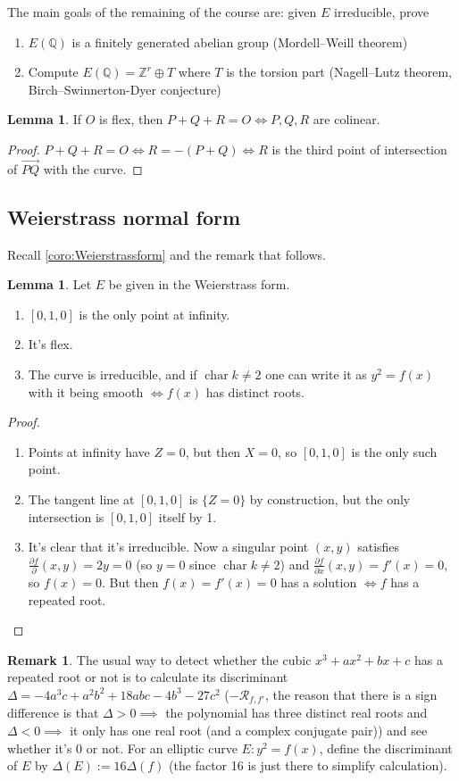 \documentclass{article}
\newcommand{\Z}{\mathbb{Z}}
\newcommand{\Q}{\mathbb{Q}}
\newcommand{\Char}{\operatorname{char}}
\theoremstyle{definition}
\newtheorem{lemma}[defn]{Lemma}
\newtheorem*{remark}{Remark}
\begin{document}
The main goals of the remaining of the course are: given $E$ irreducible, prove
\begin{enumerate}
\item $E(\Q)$ is a finitely generated abelian group (Mordell--Weill theorem)
\item Compute $E(\Q)=\Z^r\oplus T$ where $T$ is the torsion part (Nagell--Lutz theorem, Birch--Swinnerton-Dyer conjecture)
\end{enumerate}

\begin{lemma}
\label{lemma:condPQRcol}
If $O$ is flex, then $P+Q+R=O\iff P,Q,R$ are colinear.
\end{lemma}
\begin{proof}
$P+Q+R=O\iff R=-(P+Q)\iff R$ is the third point of intersection of $\overrightarrow{PQ}$ with the curve.
\end{proof}

\subsection{Weierstrass normal form}
Recall \ref{coro:Weierstrassform} and the remark that follows.
\begin{lemma}
\label{lemma:weierstrass}
Let $E$ be given in the Weierstrass form.
\begin{enumerate}
\item $[0,1,0]$ is the only point at infinity.
\item It's flex.
\item The curve is irreducible, and if $\Char k\neq 2$ one can write it as $y^2=f(x)$ with it being smooth $\iff f(x)$ has distinct roots.
\end{enumerate}
\end{lemma}
\begin{proof}
\begin{enumerate}
\item Points at infinity have $Z=0$, but then $X=0$, so $[0,1,0]$ is the only such point.
\item The tangent line at $[0,1,0]$ is $\{Z=0\}$ by construction, but the only intersection is $[0,1,0]$ itself by 1.
\item It's clear that it's irreducible. Now a singular point $(x,y)$ satisfies $\frac{\partial f}{\partial}(x,y)=2y=0$ (so $y=0$ since $\Char k\neq 2$) and $\frac{\partial f}{\partial x}(x,y)=f'(x)=0$, so $f(x)=0$. But then $f(x)=f'(x)=0$ has a solution $\iff f$ has a repeated root.
\end{enumerate}
\end{proof}
\begin{remark}
The usual way to detect whether the cubic $x^3+ax^2+bx+c$ has a repeated root or not is to calculate its discriminant $\Delta=-4a^3c+a^2b^2+18abc-4b^3-27c^2$ ($-\mathcal R_{f,f'}$, the reason that there is a sign difference is that $\Delta>0\implies$ the polynomial has three distinct real roots and $\Delta<0\implies$ it only has one real root (and a complex conjugate pair)) and see whether it's 0 or not. For an elliptic curve $E:y^2=f(x)$, define the discriminant of $E$ by $\Delta(E):=16\Delta(f)$ (the factor 16 is just there to simplify calculation).
\end{remark}
\end{document}
